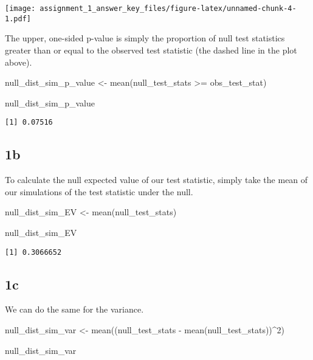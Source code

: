 \documentclass[
  12pt,
  leqno]{article}
\newenvironment{Shaded}{\begin{snugshade}}{\end{snugshade}}
\newcommand{\DecValTok}[1]{\textcolor[rgb]{0.00,0.00,0.81}{#1}}
\newcommand{\FunctionTok}[1]{\textcolor[rgb]{0.00,0.00,0.00}{#1}}
\newcommand{\NormalTok}[1]{#1}
\newcommand{\OtherTok}[1]{\textcolor[rgb]{0.56,0.35,0.01}{#1}}
\newcommand{\SpecialCharTok}[1]{\textcolor[rgb]{0.00,0.00,0.00}{#1}}
\DeclareMathOperator{\1}{\mathbbm{1}}
\begin{document}
\texttt{[image: assignment\_1\_answer\_key\_files/figure-latex/unnamed-chunk-4-1.pdf]}
\normalsize

The upper, one-sided p-value is simply the proportion of null test
statistics greater than or equal to the observed test statistic (the
dashed line in the plot above). \scriptsize

\begin{Shaded}
\begin{Highlighting}[]
\NormalTok{null\_dist\_sim\_p\_value }\OtherTok{\textless{}{-}} \FunctionTok{mean}\NormalTok{(null\_test\_stats }\SpecialCharTok{\textgreater{}=}\NormalTok{ obs\_test\_stat)}

\NormalTok{null\_dist\_sim\_p\_value}
\end{Highlighting}
\end{Shaded}

\begin{verbatim}
[1] 0.07516
\end{verbatim}

\normalsize
\subsection*{1b}

To calculate the null expected value of our test statistic, simply take
the mean of our simulations of the test statistic under the null.
\scriptsize

\begin{Shaded}
\begin{Highlighting}[]
\NormalTok{null\_dist\_sim\_EV }\OtherTok{\textless{}{-}} \FunctionTok{mean}\NormalTok{(null\_test\_stats)}

\NormalTok{null\_dist\_sim\_EV}
\end{Highlighting}
\end{Shaded}

\begin{verbatim}
[1] 0.3066652
\end{verbatim}

\normalsize
\subsection*{1c}

We can do the same for the variance. \scriptsize

\begin{Shaded}
\begin{Highlighting}[]
\NormalTok{null\_dist\_sim\_var }\OtherTok{\textless{}{-}} \FunctionTok{mean}\NormalTok{((null\_test\_stats }\SpecialCharTok{{-}} \FunctionTok{mean}\NormalTok{(null\_test\_stats))}\SpecialCharTok{\^{}}\DecValTok{2}\NormalTok{)}

\NormalTok{null\_dist\_sim\_var}
\end{Highlighting}
\end{Shaded}
\end{document}
